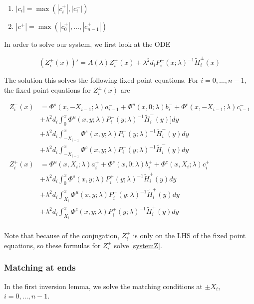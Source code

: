 \documentclass[12pt]{article}
\begin{document}
\begin{enumerate}
	\item $|c_i| = \max(|c_i^+|, |c_i^-|)$ 
	\item $|c^+| = \max(|c_0^+|, \dots, |c_{n-1}^+|)$
\end{enumerate}

In order to solve our system, we first look at the ODE

\[
(Z_i^\pm(x))' = A(\lambda) Z_i^\pm(x) + \lambda^2 d_i P_i^\pm(x; \lambda)^{-1} \tilde{H}_i^\pm(x)
\]

The solution this solves the following fixed point equations. For $i = 0, \dots, n-1$, the fixed point equations for $Z_i^\pm(x)$ are

\begin{align*}
Z_i^-(x) &= \Phi^s(x, -X_{i-1}; \lambda) a_{i-1}^- + \Phi^u(x, 0; \lambda) b_i^- + \Phi^c(x, -X_{i-1}; \lambda) c_{i-1}^- \\
&+ \lambda^2 d_i \int_0^x \Phi^u(x, y; \lambda) P_i^-(y; \lambda)^{-1} \tilde{H}_i^-(y)] dy \\
&+ \lambda^2 d_i \int_{-X_{i-1}}^x \Phi^s(x, y; \lambda) P_i^-(y; \lambda)^{-1} \tilde{H}_i^-(y) dy \\
&+ \lambda^2 d_i \int_{-X_{i-1}}^x \Phi^c(x, y; \lambda) P_i^-(y; \lambda)^{-1} \tilde{H}_i^-(y) dy  \\ 
Z_i^+(x) &= \Phi^u(x, X_i; \lambda) a_i^+ + \Phi^s(x, 0; \lambda) b_i^+ + \Phi^c(x, X_i; \lambda) c_i^+ \\
&+ \lambda^2 d_i \int_0^x \Phi^s(x, y; \lambda) P_i^+(y; \lambda)^{-1} \tilde{H}_i^+(y) dy \\
&+ \lambda^2 d_i \int_{X_i}^x \Phi^u(x, y; \lambda) P_i^+(y; \lambda)^{-1} \tilde{H}_i^+(y) dy \\
&+ \lambda^2 d_i \int_{X_i}^x \Phi^c(x, y; \lambda) P_i^+(y; \lambda)^{-1} \tilde{H}_i^+(y) dy \\
\end{align*}

Note that because of the conjugation, $Z_i^\pm$ is only on the LHS of the fixed point equations, so these formulas for $Z_i^\pm$ solve \eqref{systemZ}.


\subsubsection{Matching at ends}

In the first inversion lemma, we solve the matching conditions at $\pm X_i$, $i = 0, \dots, n-1$.
\end{document}
